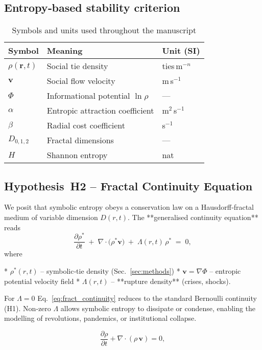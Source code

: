 \subsection{Entropy‑based stability criterion}\label{sec:entropy}
\begin{table}[h]
\caption{Symbols and units used throughout the manuscript}
\centering
\begin{tabular}{lll}
\hline
Symbol & Meaning & Unit (SI)\\\hline
$\rho(\mathbf{r},t)$ & Social tie density & ties\,m$^{-n}$\\
$\mathbf{v}$ & Social flow velocity & m\,s$^{-1}$\\
$\Phi$ & Informational potential $\ln\rho$ & —\\
$\alpha$ & Entropic attraction coefficient & m$^{2}$\,s$^{-1}$\\
$\beta$ & Radial cost coefficient & s$^{-1}$\\
$D_{0,1,2}$ & Fractal dimensions & —\\
$H$ & Shannon entropy & nat\\\hline
\end{tabular}
\subsection{Hypothesis H2 – Fractal Continuity Equation}\label{sec:H2}

We posit that symbolic entropy obeys a conservation law on a
Hausdorff‑fractal medium of variable dimension $D(r,t)$.
The **generalised continuity equation** reads
\begin{equation}
\frac{\partial \rho^\ast}{\partial t}\;+\;
\nabla\!\cdot\!\bigl(\rho^\ast \mathbf{v}\bigr)
\;+\;\Lambda(r,t)\,\rho^\ast \;=\; 0 ,
\label{eq:fract_continuity}
\end{equation}
where

* $\rho^\ast(r,t)$ – symbolic‑tie density (Sec.~\ref{sec:methods})
* $\mathbf{v}=\nabla\Phi$ – entropic potential velocity field
* $\Lambda(r,t)$ – **rupture density** (crises, shocks).

For $\Lambda\!=\!0$ Eq.~\eqref{eq:fract_continuity} reduces to the
standard Bernoulli continuity (H1).  Non‑zero $\Lambda$ allows symbolic
entropy to dissipate or condense, enabling the modelling of revolutions,
pandemics, or institutional collapse.
\label{tab:symbols}
\end{table}
\begin{equation}
\frac{\partial \rho}{\partial t} + \nabla\!\cdot\!(\rho\,\mathbf{v}) = 0 ,
\label{eq:continuity}
\end{equation}

